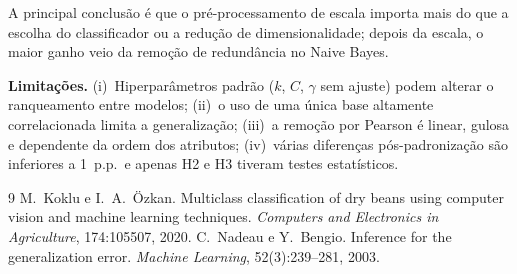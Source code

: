 \documentclass[11pt,a4paper]{article}
\begin{document}
A principal conclusão é que o pré-processamento de escala importa mais do que a escolha do classificador ou a redução de dimensionalidade; depois da escala, 
o maior ganho veio da remoção de redundância no Naive Bayes.

\textbf{Limitações.} (i)~Hiperparâmetros padrão ($k$, $C$, $\gamma$ sem ajuste) podem alterar o ranqueamento entre modelos; (ii)~o uso de uma única base 
altamente correlacionada limita a generalização; (iii)~a remoção por Pearson é linear, gulosa e dependente da ordem dos atributos; (iv)~várias diferenças 
pós-padronização são inferiores a 1~p.p.\ e apenas H2 e H3 tiveram testes estatísticos.



\begin{thebibliography}{9}
\small
{} M.~Koklu e I.~A.~Özkan. Multiclass classification of dry beans using computer vision and machine learning techniques. \textit{Computers and Electronics in Agriculture}, 174:105507, 2020.
 C.~Nadeau e Y.~Bengio. Inference for the generalization error. \textit{Machine Learning}, 52(3):239--281, 2003.
\end{thebibliography}
\end{document}
